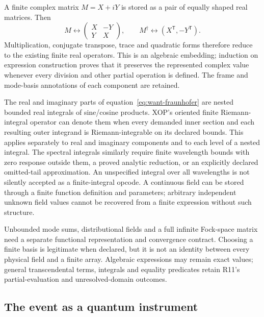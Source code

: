 A finite complex matrix $M=X+iY$ is stored as a pair of equally shaped real
matrices. Then
\begin{equation}
 M\leftrightarrow
 \begin{pmatrix}X&-Y\\Y&X\end{pmatrix},\qquad
 M^\dagger\leftrightarrow(X^{\mathsf T},-Y^{\mathsf T}).
 \label{eq:want-realification}
\end{equation}
Multiplication, conjugate transpose, trace and quadratic forms therefore
reduce to the existing finite real operators. This is an algebraic embedding;
induction on expression construction proves that it preserves the represented
complex value whenever every division and other partial operation is defined.
The frame and mode-basis annotations of each component are retained.

The real and imaginary parts of equation~\eqref{eq:want-fraunhofer} are nested
bounded real integrals of sine/cosine products. XOP's oriented finite
Riemann-integral operator can denote them when every demanded inner section
and each resulting outer integrand is Riemann-integrable on its declared
bounds. This applies separately to real and imaginary components and to each
level of a nested integral. The spectral integrals similarly
require finite wavelength bounds with zero response outside them, a proved
analytic reduction, or an explicitly declared omitted-tail approximation.
An unspecified integral over all wavelengths is not silently accepted as a
finite-integral opcode. A continuous field can be stored through a finite
function definition and parameters; arbitrary independent unknown field
values cannot be recovered from a finite expression without such structure.

Unbounded mode sums, distributional fields and a full infinite Fock-space
matrix need a separate functional representation and convergence contract.
Choosing a finite basis is legitimate when declared, but it is not an identity
between every physical field and a finite array. Algebraic expressions may
remain exact values; general transcendental terms, integrals and equality
predicates retain R11's partial-evaluation and unresolved-domain outcomes.

\subsection{The event as a quantum instrument}

